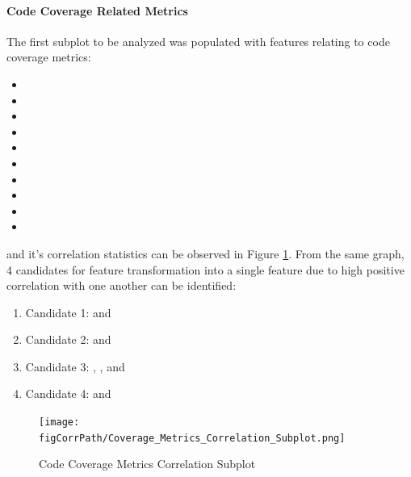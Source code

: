 \paragraph{Code Coverage Related Metrics}\label{sec:impl-data-analysis:corr:code-coverage}
The first subplot to be analyzed was populated with features relating to code coverage metrics:
\begin{itemize}\label{lst:code-coverage-candidates}
    \item \branchCoverage{}
    \item \overallBranchCoverage{}
    \item \overallCoverage{}
    \item \overallLineCoverage{}
    \item \overallUncoveredConditions{}
    \item \overallUncoveredLines{}
    \item \coverage{}
    \item \lineCoverage{}
    \item \uncoveredConditions{}
    \item \uncoveredLines{}
\end{itemize}
and it's correlation statistics can be observed in Figure \ref{fig:correlation-coverage-metrics-subplot}. From the same graph, 4 candidates for feature transformation into a single feature due to high positive correlation with one another can be identified:
\begin{enumerate}\label{lst:corr-sub:code-coverage-transf-candidates}
    \item Candidate 1: \overallBranchCoverage{} and \branchCoverage{}
    \item Candidate 2: \overallUncoveredLines{} and \uncoveredLines{}
    \item Candidate 3: \overallCoverage{}, \overallLineCoverage{}, \coverage{} and \lineCoverage{}
    \item Candidate 4: \overallUncoveredConditions and \uncoveredConditions{}
\end{enumerate}

\begin{figure}[h!]
    \centering
    \texttt{[image: \\figCorrPath/Coverage\_Metrics\_Correlation\_Subplot.png]}
    \caption{Code Coverage Metrics Correlation Subplot}
    \label{fig:correlation-coverage-metrics-subplot}
\end{figure}
\FloatBarrier

